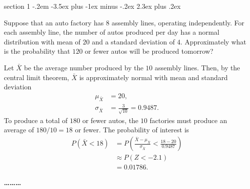 \documentclass[11pt]{exam}
\makeatletter
\newenvironment{problem}{\@startsection
       {section}
       {1}
       {-.2em}
       {-3.5ex plus -1ex minus -.2ex}
       {2.3ex plus .2ex}
       {\pagebreak[3]%
       \large\bf\noindent{Problem }
       }
       }
       {%
       \begin{center}\large\bf \ldots\ldots\ldots\end{center}}
\makeatother
\begin{document}
\begin{problem}{}

Suppose that an auto factory has $8$ assembly lines, operating
independently.  For each assembly line, the number of autos produced per day
has a normal distribution with mean of $20$ and a standard deviation of $4$. 
Approximately what is the
probability that $120$ or fewer autos will be produced tomorrow?

\begin{solution}
Let $\bar X$ be the average number produced by the $10$ assembly lines.  Then,
by the central limit theorem, $\bar X$ is approximately normal with mean and
standard deviation
\begin{align*}
  \mu_{\bar X} &= 20, \\
  \sigma_{\bar X} &= \frac{3}{\sqrt{10}} = 0.9487.
\end{align*}
To produce a total of $180$ or fewer autos, the $10$ factories must produce an
average of $180/10 = 18$ or fewer.  The probability of interest is
\begin{align*}
  P(\bar X < 18)
    &= P\left(\frac{\bar X - \mu_{\bar X}}{\sigma_{\bar X}}
          < \frac{18 - 20}{0.9487}\right) \\
    &\approx P(Z < -2.1) \\
    &= 0.01786.
\end{align*}
\end{solution}

\end{problem}
\end{document}
